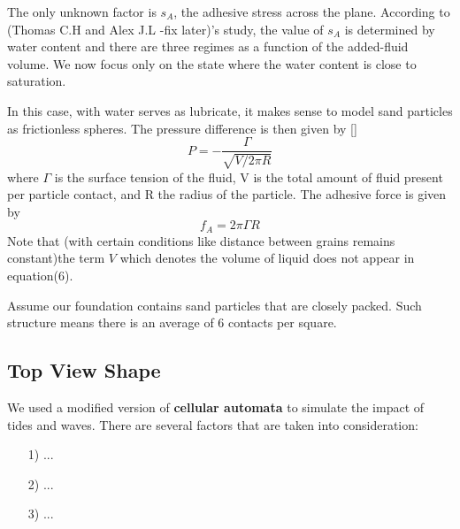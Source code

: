 \documentclass[12pt]{article}
\begin{document}
\par
The only unknown factor is $s_A$, the adhesive stress across the plane. According to (Thomas C.H and Alex J.L -fix later)'s study, the value of $s_A$ is determined by water content and there are three regimes as a function of the added-fluid volume. We now focus only on the state where the water content is close to saturation.
\par
In this case, with water serves as lubricate, it makes sense to model sand particles as frictionless spheres. The pressure difference is then given by []
$$P = -\frac{\Gamma}{\sqrt{V/2\pi R}}$$
where $\Gamma$ is the surface tension of the fluid, V is the total amount of fluid present per particle contact, and R the radius of the particle. The adhesive force is given by
$$f_A = 2\pi \Gamma R$$
Note that (with certain conditions like distance between grains remains constant)the term $V$ which denotes the volume of liquid does not appear in equation(6).
\par
Assume our foundation contains sand particles that are closely packed. Such structure means there is an average of 6 contacts per square.

\subsection{Top View Shape}
\par
We used a modified version of\textbf{ cellular automata} to simulate the impact of tides and waves. There are several factors that are taken into consideration:
\par
\begin{itemize}
    \item [1)]
          ...
    \item [2)]
          ...
    \item [3)]
          ...
\end{itemize}
\end{document}
